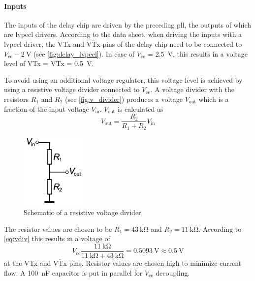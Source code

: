 \paragraph{Inputs}
The inputs of the delay chip are driven by the preceding \gls{pll}, the outputs of which are \gls{lvpecl} drivers.
According to the data sheet, when driving the inputs with a \gls{lvpecl} driver, the VTx and $\overline{\text{VTx}}$ pins of the delay chip need to be connected to $V_\text{cc} - \SI{2}{\volt}$ (see \autoref{fig:delay_lvpecl}).
In case of $V_\text{cc}$ = \SI{2.5}{\volt}, this results in a voltage level of VTx = $\overline{\text{VTx}}$ = \SI{0.5}{\volt}.

To avoid using an additional voltage regulator, this voltage level is achieved by using a resistive voltage divider connected to $V_\text{cc}$. 
A voltage divider with the resistors $R_1$ and $R_2$ (see \autoref{fig:v_divider}) produces a voltage $V_\text{out}$ which is a fraction of the input voltage $V_\text{in}$.
$V_\text{out}$ is calculated as
\begin{equation}\label{eq:vdiv}
	V_\text{out} = \frac{R_2}{R_1 + R_2} V_\text{in}
\end{equation}
\begin{figure}[tbh]
	\centering
	\includegraphics[width = 0.3\textwidth]{chap/04-work/img/voltage_divider.pdf}
	\caption{Schematic of a resistive voltage divider}
	\label{fig:v_divider}
\end{figure}
The resistor values are chosen to be $R_1 = \SI{43}{\kilo\ohm}$ and $R_2 = \SI{11}{\kilo\ohm}$.
According to \autoref{eq:vdiv} this results in a voltage of
\begin{equation}
	V_\text{cc} \frac{\SI{11}{\kilo\ohm}}{\SI{11}{\kilo\ohm} + \SI{43}{\kilo\ohm}} = \SI{0.5093}{\volt} \approx \SI{0.5}{\volt}
\end{equation}
at the VTx and $\overline{\text{VTx}}$ pins.
Resistor values are chosen high to minimize current flow.
A \SI{100}{\nano\farad} capacitor is put in parallel for $V_\text{cc}$ decoupling.

